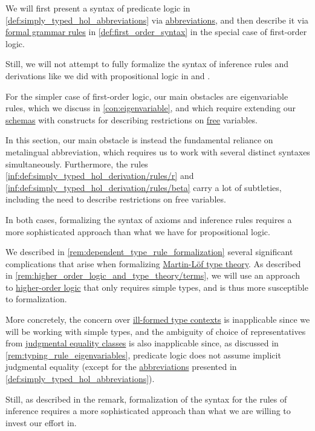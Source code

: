 \begin{remark}\label{rem:predicate_logic_formalization}
  We will first present a syntax of predicate logic in \cref{def:simply_typed_hol_abbreviations} via \hyperref[con:metalingual_abbreviation]{abbreviations}, and then describe it via \hyperref[def:formal_grammar]{formal grammar rules} in \cref{def:first_order_syntax} in the special case of first-order logic.

  Still, we will not attempt to fully formalize the syntax of inference rules and derivations like we did with propositional logic in  and .

  For the simpler case of first-order logic, our main obstacles are eigenvariable rules, which we discuss in \cref{con:eigenvariable}, and which require extending our \hyperref[con:schemas_and_instances]{schemas} with constructs for describing restrictions on \hyperref[con:variable_binding]{free} variables.

  In this section, our main obstacle is instead the fundamental reliance on metalingual abbreviation, which requires us to work with several distinct syntaxes simultaneously. Furthermore, the rules \ref{inf:def:simply_typed_hol_derivation/rules/r} and \ref{inf:def:simply_typed_hol_derivation/rules/beta} carry a lot of subtleties, including the need to describe restrictions on free variables.

  In both cases, formalizing the syntax of axioms and inference rules requires a more sophisticated approach than what we have for propositional logic.
\end{remark}
\begin{comments}
  \item We described in \cref{rem:dependent_type_rule_formalization} several significant complications that arise when formalizing \hyperref[def:mltt]{Martin-L\"of type theory}. As described in \cref{rem:higher_order_logic_and_type_theory/terms}, we will use an approach to \hyperref[rem:predicate_logic]{higher-order logic} that only requires simple types, and is thus more susceptible to formalization.

  More concretely, the concern over \hyperref[rem:well_formed_contexts]{ill-formed type contexts} is inapplicable since we will be working with simple types, and the ambiguity of choice of representatives from \hyperref[con:equality]{judgmental equality classes} is also inapplicable since, as discussed in \cref{rem:typing_rule_eigenvariables}, predicate logic does not assume implicit judgmental equality (except for the \hyperref[con:metalingual_abbreviation]{abbreviations} presented in \cref{def:simply_typed_hol_abbreviations}).

  Still, as described in the remark, formalization of the syntax for the rules of inference requires a more sophisticated approach than what we are willing to invest our effort in.
\end{comments}

